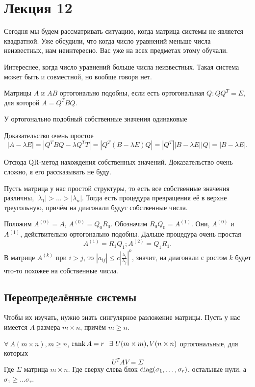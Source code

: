 \section{Лекция 12}
Сегодня мы будем рассматривать ситуацию, когда матрица системы не является квадратной. Уже обсудили, что когда число уравнений меньше числа неизвестных, нам неинтересно. Вас уже на всех предметах этому обучали.

Интереснее, когда число уравнений больше числа неизвестных. Такая система может быть и совместной, но вообще говоря нет. 

\begin{Def}
Матрицы $A$ и $AB$ ортогонально подобны, если есть ортогональная $Q\colon QQ^T=E$, для которой $A = Q^T B Q$.
\end{Def}

\begin{Ut}
  У ортогонально подобный собственные значения одинаковые
\end{Ut}
\begin{Proof}
Доказательство очень простое
\[
  |A-\lambda E| = |Q^T B Q - \lambda Q^T T| = |Q^T (B-\lambda E) Q| = |Q^T| |B-\lambda E| |Q| = |B-\lambda E|.
\]
\end{Proof}

Отсюда QR-метод нахождения собственных значений. Доказательство очень сложно, я его рассказывать не буду.

Пусть матрица у нас простой структуры, то есть все собственные значения различны, $|\lambda_1| >\dots >|\lambda_n|$.
Тогда есть процедура превращения её в верхне треугольную, причём на диагонали будут собственные числа.

Положим $A^{(0)}=A$, $A^{(0)} = Q_0R_0$. Обозначим $R_0Q_0 = A^{(1)}$. Они, $A^{(0)}$ и $A^{(1)}$,  действительно ортогонально подобны. Дальше процедура очень простая
\[
  A^{(1)} = R_1 Q_1; A^{(2)} = Q_1 R_1.
\]
В матрице $A^{(k)}$ при $i>j$, то $|a_{ij}|\le c\left|\frac{\lambda_i}{\lambda_j}\right|^k$, значит, на диагонали с ростом $k$ будет что-то похожее на собственные числа.

\subsection{Переопределённые системы}

Чтобы их изучать, нужно знать сингулярное разложение матрицы.
Пусть у нас имеется $A$ размера $m\times n$, причём $m\ge n$.
\begin{The}
 $\forall\ A(m\times n), m\ge n$, $\rang A = r\pau \exists\ U(m\times m), V(n\times n)$ ортогональные, для которых
\[
  U^T A V = \Sigma
\]
Где $\Sigma$ матрица $m\times n$. Где сверху слева блок $\operatorname{diag} (\sigma_1,\dots,\sigma_r)$, остальные нули, а $\sigma_1\ge \dots \sigma_r$.
\end{The}

